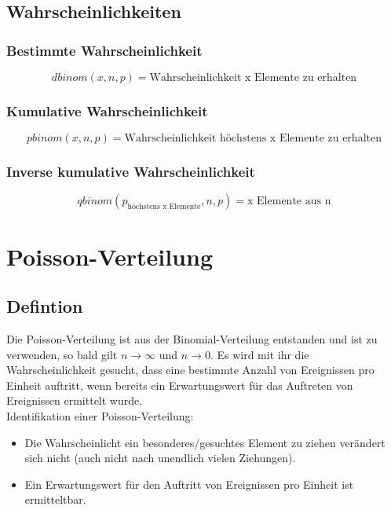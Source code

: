\documentclass[a4paper,10pt]{article}
\begin{document}
\subsection{Wahrscheinlichkeiten}
\subsubsection{Bestimmte Wahrscheinlichkeit}
\begin{equation}
  \label{eq:3}
  dbinom(x, n, p) = \text{Wahrscheinlichkeit x Elemente zu erhalten}
\end{equation}

\subsubsection{Kumulative Wahrscheinlichkeit}
\begin{equation}
  \label{eq:4}
  pbinom(x, n, p) = \text{Wahrscheinlichkeit höchstens x Elemente zu erhalten}
\end{equation}

\subsubsection{Inverse kumulative Wahrscheinlichkeit}
\begin{equation}
  \label{eq:5}
  qbinom(p_{\text{höchstens x Elemente}}, n, p) = \text{x Elemente aus n}
\end{equation}

\section{Poisson-Verteilung}
\subsection{Defintion}
Die Poisson-Verteilung ist aus der Binomial-Verteilung entstanden und
ist zu verwenden, so bald gilt $ n \rightarrow \infty $ und $ n
\rightarrow 0 $. Es wird mit ihr die Wahrscheinlichkeit gesucht, dass
eine bestimmte Anzahl von Ereignissen pro Einheit auftritt, wenn
bereits ein Erwartungswert für das Auftreten von Ereignissen ermittelt
wurde.
\\
Identifikation einer Poisson-Verteilung:
\begin{itemize}
\item Die Wahrscheinlicht ein besonderes/gesuchtes Element zu ziehen
  verändert sich nicht (auch nicht nach unendlich vielen Ziehungen).
\item Ein Erwartungswert für den Auftritt von Ereignissen pro Einheit
  ist ermitteltbar.
\end{itemize}
\end{document}
